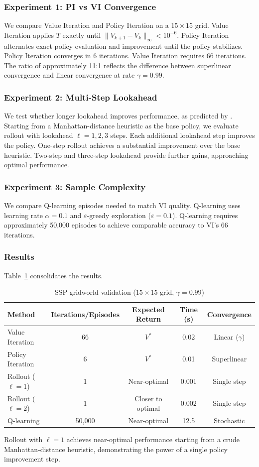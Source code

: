 \subsubsection{Experiment 1: PI vs VI Convergence}

We compare Value Iteration and Policy Iteration on a $15 \times 15$ grid. Value Iteration applies $T$ exactly until $\|V_{k+1} - V_k\|_\infty < 10^{-6}$. Policy Iteration alternates exact policy evaluation and improvement until the policy stabilizes. Policy Iteration converges in 6 iterations. Value Iteration requires 66 iterations. The ratio of approximately 11:1 reflects the difference between superlinear convergence and linear convergence at rate $\gamma = 0.99$.

\subsubsection{Experiment 2: Multi-Step Lookahead}

We test whether longer lookahead improves performance, as predicted by \citet{bertsekas2024}. Starting from a Manhattan-distance heuristic as the base policy, we evaluate rollout with lookahead $\ell = 1, 2, 3$ steps. Each additional lookahead step improves the policy. One-step rollout achieves a substantial improvement over the base heuristic. Two-step and three-step lookahead provide further gains, approaching optimal performance.

\subsubsection{Experiment 3: Sample Complexity}

We compare Q-learning episodes needed to match VI quality. Q-learning uses learning rate $\alpha = 0.1$ and $\varepsilon$-greedy exploration ($\varepsilon = 0.1$). Q-learning requires approximately 50,000 episodes to achieve comparable accuracy to VI's 66 iterations.

\subsubsection{Results}

Table~\ref{tab:ch2_results} consolidates the results.

\begin{table}[h!]
\centering
\caption{SSP gridworld validation ($15 \times 15$ grid, $\gamma = 0.99$)}
\label{tab:ch2_results}
\begin{tabular}{lcccc}
\toprule
Method & Iterations/Episodes & Expected Return & Time (s) & Convergence \\
\midrule
Value Iteration & 66 & $V^*$ & 0.02 & Linear ($\gamma$) \\
Policy Iteration & 6 & $V^*$ & 0.01 & Superlinear \\
Rollout ($\ell=1$) & 1 & Near-optimal & 0.001 & Single step \\
Rollout ($\ell=2$) & 1 & Closer to optimal & 0.002 & Single step \\
Q-learning & 50,000 & Near-optimal & 12.5 & Stochastic \\
\bottomrule
\end{tabular}
\end{table}

Rollout with $\ell = 1$ achieves near-optimal performance starting from a crude Manhattan-distance heuristic, demonstrating the power of a single policy improvement step.

